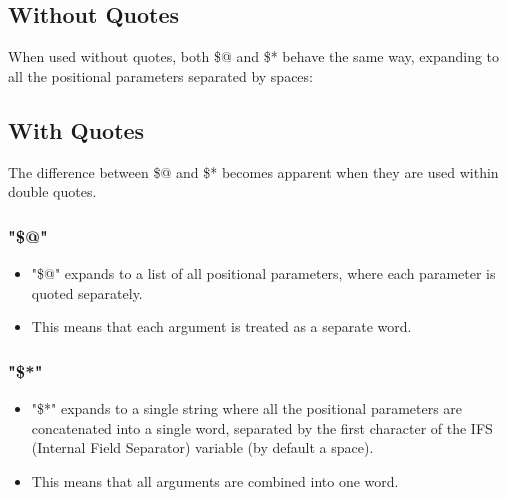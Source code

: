 \documentclass{report}
\begin{document}
    \subsection{Without Quotes}
    \bigbreak \noindent 
    When used without quotes, both \$@ and \$* behave the same way, expanding to all the positional parameters separated by spaces:

    \bigbreak \noindent 
    \subsection{With Quotes}
    The difference between \$@ and \$* becomes apparent when they are used within double quotes.
    \subsubsection{"\$@"}
    \begin{itemize}
        \item "\$@" expands to a list of all positional parameters, where each parameter is quoted separately.
        \item This means that each argument is treated as a separate word.
    \end{itemize}
    \bigbreak \noindent 
    \subsubsection{"\$*"}
    \begin{itemize}
        \item "\$*" expands to a single string where all the positional parameters are concatenated into a single word, separated by the first character of the IFS (Internal Field Separator) variable (by default a space).
        \item This means that all arguments are combined into one word.
    \end{itemize}
\end{document}
